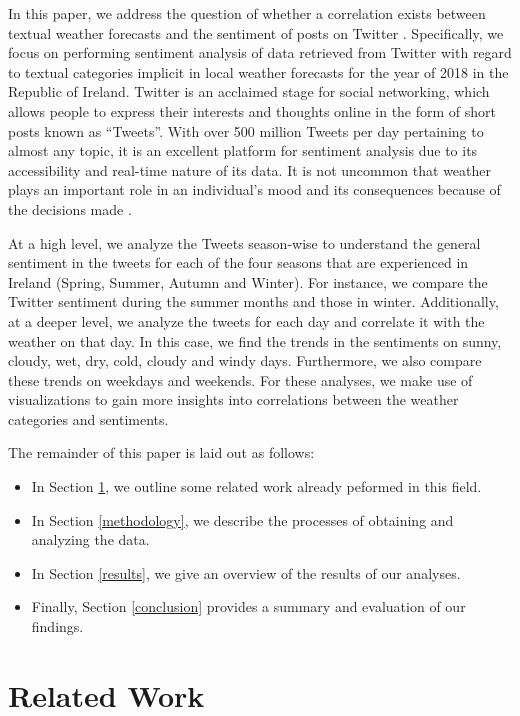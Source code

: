 \documentclass[a4paper,10pt]{article}
\begin{document}
    
    In this paper, we address the question of whether a correlation exists between textual weather forecasts and the sentiment of posts on Twitter . Specifically, we focus on performing sentiment analysis of data retrieved from Twitter with regard to textual categories implicit in local weather forecasts for the year of 2018 in the Republic of Ireland. 
    Twitter is an acclaimed stage for social networking, which allows people to express their interests and thoughts online in the form of short posts known as “Tweets”. With over 500 million Tweets per day pertaining to almost any topic, it is an excellent platform for sentiment analysis due to its accessibility and real-time nature of its data. It is not uncommon that weather plays an important role in an individual’s mood and its consequences because of the decisions made .
    
    At a high level, we analyze the Tweets season-wise to understand the general sentiment in the tweets for each of the four seasons that are experienced in Ireland (Spring, Summer, Autumn and Winter). For instance, we compare the Twitter sentiment during the summer months and those in winter. Additionally, at a deeper level, we analyze the tweets for each day and correlate it with the weather on that day. In this case, we find the trends in the sentiments on sunny, cloudy, wet, dry, cold, cloudy and windy days. Furthermore, we also compare these trends on weekdays and weekends. For these analyses, we make use of visualizations to gain more insights into correlations between the weather categories and sentiments.

    The remainder of this paper is laid out as follows:
    \begin{itemize}
        \item{In Section \ref{related_work}, we outline some related work already peformed in this field.}
        \item{In Section \ref{methodology}, we describe the processes of obtaining and analyzing the data.}
        \item{In Section \ref{results}, we give an overview of the results of our analyses.}
        \item{Finally, Section \ref{conclusion} provides a summary and evaluation of our findings.}
    \end{itemize}


    \section{Related Work}
    \label{related_work}
\end{document}
